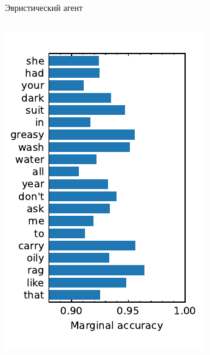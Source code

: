 \documentclass[aspectratio=169]{beamer}
\begin{document}
\begin{frame}{Эвристический агент}
    \begin{columns}
        \includegraphics[height=.8\textheight]{../plots/word_scores.pdf}
    \end{columns}
\end{frame}
\end{document}
